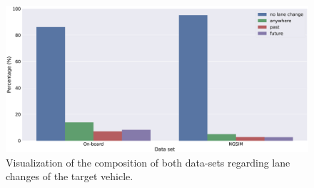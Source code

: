\begin{figure}[t]
    \centering
    \includegraphics[width=1.\linewidth]{imgs/data_set_lane_change_distribution.eps}
    \caption{Visualization of the composition of both data-sets regarding lane changes of the target vehicle.}
    \label{fig:data_set_lane_change_distribution}
\end{figure}

